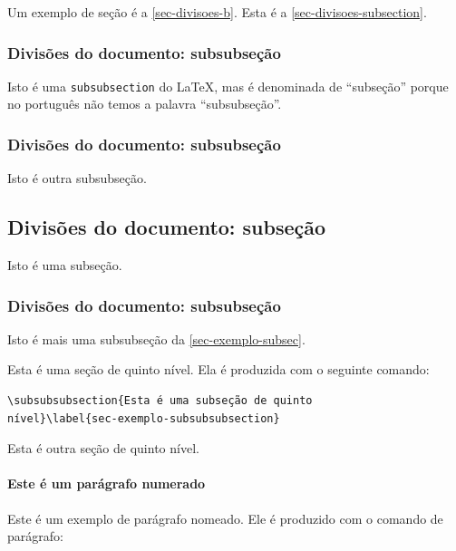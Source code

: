 Um exemplo de seção é a \autoref{sec-divisoes-b}. Esta é a \autoref{sec-divisoes-subsection}.

\subsubsection{Divisões do documento: subsubseção}\label{sec-divisoes-subsubsection}

Isto é uma \texttt{subsubsection} do \LaTeX, mas é denominada de ``subseção'' porque no português não temos a palavra ``subsubseção''.

\subsubsection{Divisões do documento: subsubseção}

Isto é outra subsubseção.

\subsection{Divisões do documento: subseção}\label{sec-exemplo-subsec}

Isto é uma subseção.

\subsubsection{Divisões do documento: subsubseção}

Isto é mais uma subsubseção da \autoref{sec-exemplo-subsec}.


\label{sec-exemplo-subsubsubsection}

Esta é uma seção de quinto nível. Ela é produzida com o seguinte comando:

\begin{verbatim}
\subsubsubsection{Esta é uma subseção de quinto
nível}\label{sec-exemplo-subsubsubsection}
\end{verbatim}

\label{sec-exemplo-subsubsubsection-outro}

Esta é outra seção de quinto nível.


\paragraph{Este é um parágrafo numerado}\label{sec-exemplo-paragrafo}

Este é um exemplo de parágrafo nomeado. Ele é produzido com o comando de
parágrafo:

